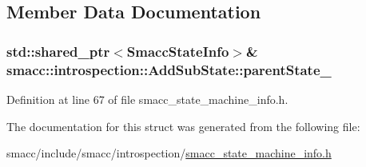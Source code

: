 \subsection{Member Data Documentation}
\subsubsection[{\texorpdfstring{parent\+State\+\_\+}{parentState_}}]{\setlength{\rightskip}{0pt plus 5cm}std\+::shared\+\_\+ptr$<${\bf Smacc\+State\+Info}$>$\& smacc\+::introspection\+::\+Add\+Sub\+State\+::parent\+State\+\_\+}\hypertarget{structsmacc_1_1introspection_1_1AddSubState_a17bd7a0edd62758b94907ecc3644cd29}{}\label{structsmacc_1_1introspection_1_1AddSubState_a17bd7a0edd62758b94907ecc3644cd29}


Definition at line 67 of file smacc\+\_\+state\+\_\+machine\+\_\+info.\+h.



The documentation for this struct was generated from the following file\+:\begin{DoxyCompactItemize}
\item 
smacc/include/smacc/introspection/\hyperlink{smacc__state__machine__info_8h}{smacc\+\_\+state\+\_\+machine\+\_\+info.\+h}\end{DoxyCompactItemize}
